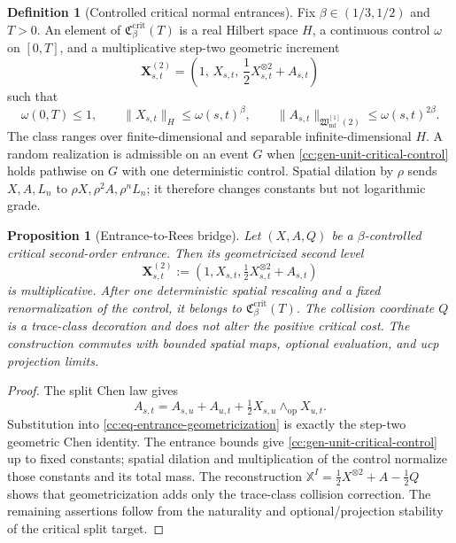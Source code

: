 \documentclass[10pt,reqno]{amsart}
\theoremstyle{plain}
\newtheorem{proposition}[theorem]{Proposition}
\theoremstyle{definition}
\newtheorem{definition}[theorem]{Definition}
\theoremstyle{remark}
\begin{document}
\begin{definition}[Controlled critical normal entrances]
\label{cc:gen-definition-critical-class}
Fix \(\beta\in(1/3,1/2)\) and \(T>0\).  An element of
\(\mathfrak C_{\beta}^{\mathrm{crit}}(T)\) is a real Hilbert space
\(H\), a continuous control \(\omega\) on \([0,T]\), and a
multiplicative step-two geometric increment
\[
 {\mathbf X}^{(2)}_{s,t}
 =
 \left(
  1,\,
  X_{s,t},\,
  \frac12X_{s,t}^{\otimes2}+A_{s,t}
 \right)
\]
such that
\begin{equation}
 \omega(0,T)\leq1,\qquad
 \|X_{s,t}\|_H\leq\omega(s,t)^\beta,\qquad
 \|A_{s,t}\|_{\mathfrak W_{\mathrm{mf}}^{[1]}(2)}
 \leq\omega(s,t)^{2\beta}.
 \label{cc:gen-unit-critical-control}
\end{equation}
The class ranges over finite-dimensional and separable
infinite-dimensional \(H\).  A random realization is admissible on an
event \(G\) when \eqref{cc:gen-unit-critical-control} holds pathwise on
\(G\) with one deterministic control.  Spatial dilation by \(\rho\)
sends \(X,A,L_n\) to \(\rho X,\rho^2A,\rho^nL_n\); it therefore changes
constants but not logarithmic grade.
\end{definition}

\begin{proposition}[Entrance-to-Rees bridge]
\label{cc:prop-entrance-to-Rees-bridge}
Let \((X,A,Q)\) be a \(\beta\)-controlled critical second-order entrance.
Then its geometricized second level
\begin{equation}
 {\mathbf X}^{(2)}_{s,t}
 :=\left(1,X_{s,t},\tfrac12X_{s,t}^{\otimes2}+A_{s,t}\right)
 \label{cc:eq-entrance-geometricization}
\end{equation}
is multiplicative.  After one deterministic spatial rescaling and a fixed
renormalization of the control, it belongs to
\(\mathfrak C_\beta^{\mathrm{crit}}(T)\).  The collision coordinate \(Q\)
is a trace-class decoration and does not alter the positive critical cost.
The construction commutes with bounded spatial maps, optional evaluation,
and ucp projection limits.
\end{proposition}

\begin{proof}
The split Chen law gives
\[
 A_{s,t}=A_{s,u}+A_{u,t}+\tfrac12X_{s,u}\wedge_{\mathrm{op}}X_{u,t}.
\]
Substitution into \eqref{cc:eq-entrance-geometricization} is exactly the
step-two geometric Chen identity.  The entrance bounds give
\eqref{cc:gen-unit-critical-control} up to fixed constants; spatial dilation
and multiplication of the control normalize those constants and its total
mass.  The reconstruction
\(\mathbb X^I=\frac12X^{\otimes2}+A-\frac12Q\) shows that geometricization
adds only the trace-class collision correction.  The remaining assertions
follow from the naturality and optional/projection stability of the critical
split target.
\end{proof}
\end{document}

